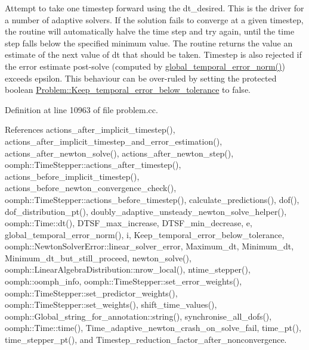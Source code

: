 Attempt to take one timestep forward using the dt\+\_\+desired. This is the driver for a number of adaptive solvers. If the solution fails to converge at a given timestep, the routine will automatically halve the time step and try again, until the time step falls below the specified minimum value. The routine returns the value an estimate of the next value of dt that should be taken. Timestep is also rejected if the error estimate post-\/solve (computed by \hyperlink{classoomph_1_1Problem_ac7667864b71a3889c95c29307422ac8e}{global\+\_\+temporal\+\_\+error\+\_\+norm()}) exceeds epsilon. This behaviour can be over-\/ruled by setting the protected boolean \hyperlink{classoomph_1_1Problem_ab27af4a444de9f59125ee50ac778d97a}{Problem\+::\+Keep\+\_\+temporal\+\_\+error\+\_\+below\+\_\+tolerance} to false. 

Definition at line 10963 of file problem.\+cc.



References actions\+\_\+after\+\_\+implicit\+\_\+timestep(), actions\+\_\+after\+\_\+implicit\+\_\+timestep\+\_\+and\+\_\+error\+\_\+estimation(), actions\+\_\+after\+\_\+newton\+\_\+solve(), actions\+\_\+after\+\_\+newton\+\_\+step(), oomph\+::\+Time\+Stepper\+::actions\+\_\+after\+\_\+timestep(), actions\+\_\+before\+\_\+implicit\+\_\+timestep(), actions\+\_\+before\+\_\+newton\+\_\+convergence\+\_\+check(), oomph\+::\+Time\+Stepper\+::actions\+\_\+before\+\_\+timestep(), calculate\+\_\+predictions(), dof(), dof\+\_\+distribution\+\_\+pt(), doubly\+\_\+adaptive\+\_\+unsteady\+\_\+newton\+\_\+solve\+\_\+helper(), oomph\+::\+Time\+::dt(), D\+T\+S\+F\+\_\+max\+\_\+increase, D\+T\+S\+F\+\_\+min\+\_\+decrease, e, global\+\_\+temporal\+\_\+error\+\_\+norm(), i, Keep\+\_\+temporal\+\_\+error\+\_\+below\+\_\+tolerance, oomph\+::\+Newton\+Solver\+Error\+::linear\+\_\+solver\+\_\+error, Maximum\+\_\+dt, Minimum\+\_\+dt, Minimum\+\_\+dt\+\_\+but\+\_\+still\+\_\+proceed, newton\+\_\+solve(), oomph\+::\+Linear\+Algebra\+Distribution\+::nrow\+\_\+local(), ntime\+\_\+stepper(), oomph\+::oomph\+\_\+info, oomph\+::\+Time\+Stepper\+::set\+\_\+error\+\_\+weights(), oomph\+::\+Time\+Stepper\+::set\+\_\+predictor\+\_\+weights(), oomph\+::\+Time\+Stepper\+::set\+\_\+weights(), shift\+\_\+time\+\_\+values(), oomph\+::\+Global\+\_\+string\+\_\+for\+\_\+annotation\+::string(), synchronise\+\_\+all\+\_\+dofs(), oomph\+::\+Time\+::time(), Time\+\_\+adaptive\+\_\+newton\+\_\+crash\+\_\+on\+\_\+solve\+\_\+fail, time\+\_\+pt(), time\+\_\+stepper\+\_\+pt(), and Timestep\+\_\+reduction\+\_\+factor\+\_\+after\+\_\+nonconvergence.


